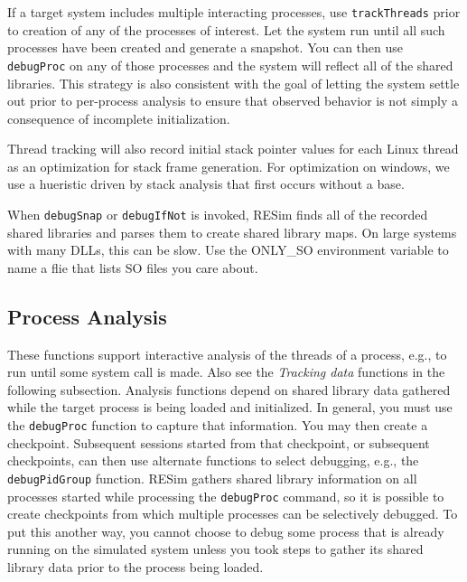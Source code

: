 \documentclass[titlepage]{article}
\begin{document}
If a target system includes multiple interacting processes, use {\tt trackThreads} prior to creation of any of the processes of interest.
Let the system run until all such processes have been created and generate a snapshot.  You can then use {\tt debugProc} on any of those
processes and the system will reflect all of the shared libraries.  This strategy is also consistent with the goal of letting the system 
settle out prior to per-process analysis to ensure that observed behavior is not simply a consequence of incomplete initialization.

Thread tracking will also record initial stack pointer values for each Linux thread as an optimization for stack frame generation.
For optimization on windows, we use a hueristic driven by stack analysis that first occurs without a base.

When {\tt debugSnap} or {\tt debugIfNot} is invoked, RESim finds all of the recorded shared libraries and parses them to create shared library maps.
On large systems with many DLLs, this can be slow.  Use the ONLY\_SO environment variable to name a flie that lists SO files you care about.

\subsection{Process Analysis}
These functions support interactive analysis of the threads of a process, e.g., to run until some system call is made.  Also see the \textit{Tracking data} functions
in the following subsection.  Analysis functions depend on shared library data gathered while the target process is being loaded and initialized.  In general, you
must use the {\tt debugProc} function to capture that information.  You may then create a checkpoint.  Subsequent sessions started from that checkpoint,
or subsequent checkpoints, can then use alternate functions to select debugging, e.g., the {\tt debugPidGroup} function. RESim gathers shared library information on
all processes started while processing the {\tt debugProc} command, so it is possible to create checkpoints from which multiple processes can be selectively
debugged.  To put this another way, you cannot choose to debug some process that is already running on the simulated system unless you took steps to
gather its shared library data prior to the process being loaded.
\end{document}
